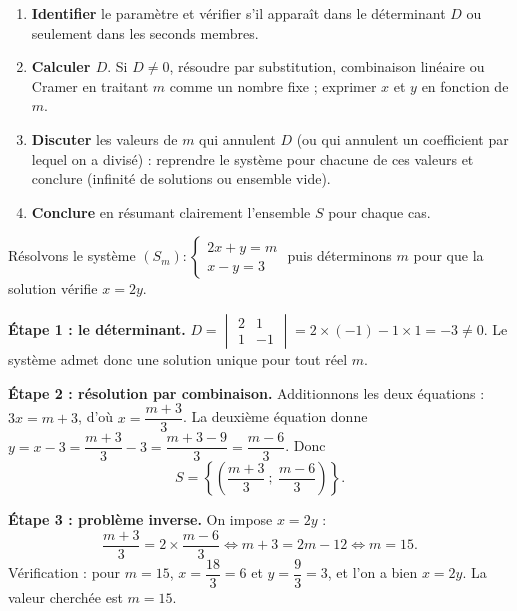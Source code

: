 \documentclass[11pt]{article}
\begin{document}
\begin{methode}
\begin{enumerate}
\item \textbf{Identifier} le paramètre et vérifier s'il apparaît dans le déterminant $D$ ou seulement dans les seconds membres.
\item \textbf{Calculer $D$}. Si $D \neq 0$, résoudre par substitution, combinaison linéaire ou Cramer en traitant $m$ comme un nombre fixe ; exprimer $x$ et $y$ en fonction de $m$.
\item \textbf{Discuter} les valeurs de $m$ qui annulent $D$ (ou qui annulent un coefficient par lequel on a divisé) : reprendre le système pour chacune de ces valeurs et conclure (infinité de solutions ou ensemble vide).
\item \textbf{Conclure} en résumant clairement l'ensemble $S$ pour chaque cas.
\end{enumerate}
\end{methode}

\begin{exemplebox}
Résolvons le système $(S_m) : \begin{cases} 2x + y = m \\ x - y = 3 \end{cases}$ puis déterminons $m$ pour que la solution vérifie $x = 2y$.

\textbf{Étape 1 : le déterminant.} $D = \begin{vmatrix} 2 & 1 \\ 1 & -1 \end{vmatrix} = 2\times(-1) - 1\times 1 = -3 \neq 0$. Le système admet donc une solution unique pour tout réel $m$.

\textbf{Étape 2 : résolution par combinaison.} Additionnons les deux équations : $3x = m + 3$, d'où $x = \dfrac{m+3}{3}$. La deuxième équation donne $y = x - 3 = \dfrac{m+3}{3} - 3 = \dfrac{m+3-9}{3} = \dfrac{m - 6}{3}$. Donc
\[
S = \left\{ \left( \frac{m+3}{3}\ ;\ \frac{m-6}{3} \right) \right\}.
\]

\textbf{Étape 3 : problème inverse.} On impose $x = 2y$ :
\[
\frac{m+3}{3} = 2\times\frac{m-6}{3} \iff m + 3 = 2m - 12 \iff m = 15.
\]
Vérification : pour $m = 15$, $x = \dfrac{18}{3} = 6$ et $y = \dfrac{9}{3} = 3$, et l'on a bien $x = 2y$. La valeur cherchée est $m = 15$.
\end{exemplebox}
\end{document}
